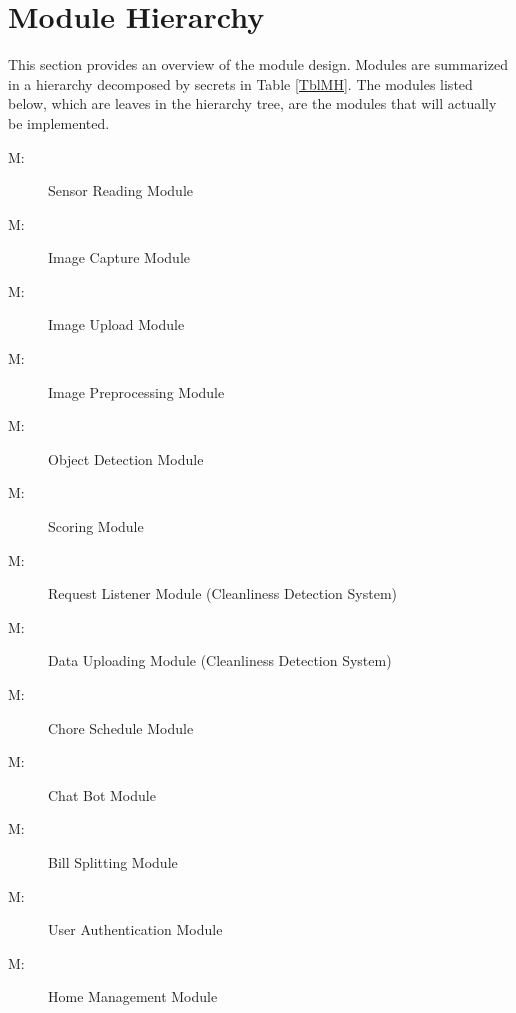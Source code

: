\documentclass[12pt, titlepage]{article}
\newcounter{mnum}
\newcommand{\mthemnum}{M\themnum}
\begin{document}
\section{Module Hierarchy} \label{SecMH}

This section provides an overview of the module design. Modules are summarized
in a hierarchy decomposed by secrets in Table \ref{TblMH}. The modules listed
below, which are leaves in the hierarchy tree, are the modules that will
actually be implemented.

\begin{description}
\item [ \mthemnum \label{mSR}:] Sensor Reading Module
\item [ \mthemnum \label{mIC}:] Image Capture Module
\item [ \mthemnum \label{mIU}:] Image Upload Module
\item [ \mthemnum \label{mIP}:] Image Preprocessing Module
\item [ \mthemnum \label{mOD}:] Object Detection Module
\item [ \mthemnum \label{mS}:] Scoring Module 
\item [ \mthemnum \label{mRL}:] Request Listener Module (Cleanliness Detection System)
\item [ \mthemnum \label{mDU}:] Data Uploading Module (Cleanliness Detection System)
\item [ \mthemnum \label{mCS}:] Chore Schedule Module
\item [ \mthemnum \label{mCB}:] Chat Bot Module
\item [ \mthemnum \label{mBS}:] Bill Splitting Module
\item [ \mthemnum \label{mUA}:] User Authentication Module
\item [ \mthemnum \label{mHM}:] Home Management Module
\end{description}
\end{document}
